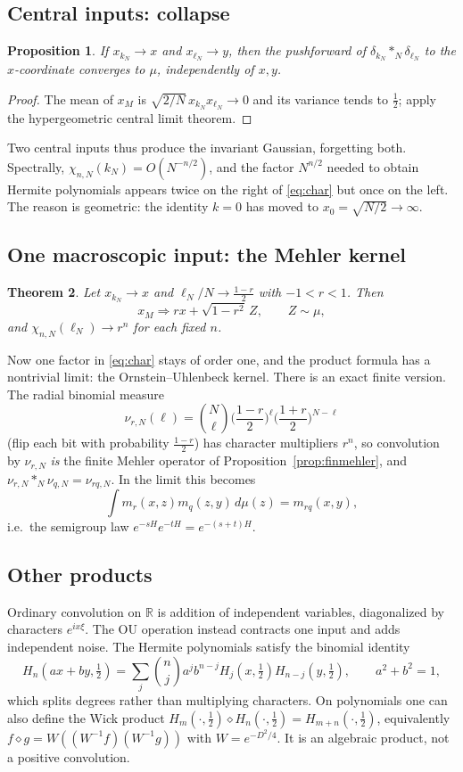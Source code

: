 \documentclass[11pt,reqno]{amsart}
\newtheorem{theorem}{Theorem}[section]
\newtheorem{proposition}[theorem]{Proposition}
\theoremstyle{definition}
\theoremstyle{remark}
\newcommand{\R}{\mathbb R}
\begin{document}
\subsection{Central inputs: collapse}
\begin{proposition}\label{prop:collapse}
If $x_{k_N}\to x$ and $x_{\ell_N}\to y$, then the pushforward of
$\delta_{k_N}*_N\delta_{\ell_N}$ to the $x$-coordinate converges to $\mu$,
independently of $x,y$.
\end{proposition}
\begin{proof}
The mean of $x_M$ is $\sqrt{2/N}\,x_{k_N}x_{\ell_N}\to0$ and its variance
tends to $\frac12$; apply the hypergeometric central limit theorem.
\end{proof}
Two central inputs thus produce the invariant Gaussian, forgetting both.
Spectrally, $\chi_{n,N}(k_N)=O(N^{-n/2})$, and the factor $N^{n/2}$ needed
to obtain Hermite polynomials appears twice on the right of
\eqref{eq:char} but once on the left. The reason is geometric: the
identity $k=0$ has moved to $x_0=\sqrt{N/2}\to\infty$.

\subsection{One macroscopic input: the Mehler kernel}
\begin{theorem}\label{thm:mixed}
Let $x_{k_N}\to x$ and $\ell_N/N\to\frac{1-r}2$ with $-1<r<1$. Then
\[
x_M\Longrightarrow rx+\sqrt{1-r^2}\,Z,\qquad Z\sim\mu,
\]
and $\chi_{n,N}(\ell_N)\to r^n$ for each fixed $n$.
\end{theorem}
Now one factor in \eqref{eq:char} stays of order one, and the product
formula has a nontrivial limit: the Ornstein--Uhlenbeck kernel. There
is an exact finite version. The radial binomial measure
\[
\nu_{r,N}(\ell)=\binom N\ell\Big(\frac{1-r}2\Big)^\ell\Big(\frac{1+r}2\Big)^{N-\ell}
\]
(flip each bit with probability $\frac{1-r}{2}$) has character
multipliers $r^n$, so convolution by $\nu_{r,N}$ \emph{is} the finite
Mehler operator of Proposition~\ref{prop:finmehler}, and
$\nu_{r,N}*_N\nu_{q,N}=\nu_{rq,N}$. In the limit this becomes
\[
\int m_r(x,z)m_q(z,y)\,d\mu(z)=m_{rq}(x,y),
\]
i.e.\ the semigroup law $e^{-sH}e^{-tH}=e^{-(s+t)H}$.

\subsection{Other products}
Ordinary convolution on $\R$ is addition of independent variables,
diagonalized by characters $e^{ix\xi}$. The OU operation instead
contracts one input and adds independent noise. The Hermite polynomials
satisfy the binomial identity
\[
H_n(ax+by,\tfrac12)=\sum_j\binom nja^jb^{n-j}H_j(x,\tfrac12)H_{n-j}(y,\tfrac12),
\qquad a^2+b^2=1,
\]
which splits degrees rather than multiplying characters. On polynomials
one can also define the Wick product
$H_m(\cdot,\frac12)\diamond H_n(\cdot,\frac12)=H_{m+n}(\cdot,\frac12)$,
equivalently $f\diamond g=W((W^{-1}f)(W^{-1}g))$ with $W=e^{-D^2/4}$.
It is an algebraic product, not a positive convolution.
\end{document}
